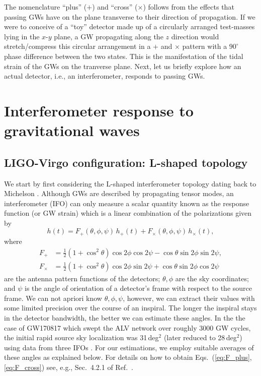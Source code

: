 \documentclass[prd,amsmath,amssymb,aps,floats,amsfonts,notitlepage,superscriptaddress,eqsecnum,nofootinbib,10pt]{revtex4-1}
\newcommand{\f}{\frac}
\newcommand{\be}{\begin{equation}}
\newcommand{\ee}{\end{equation}}
\begin{document}
The nomenclature ``plus'' ($+$) and ``cross'' ($\times$) follows from the effects that passing GWs have on the plane transverse to their direction of propagation.
If we were to conceive of a ``toy'' detector made up of a circularly arranged test-masses lying in the $x$-$y$ plane, a GW propagating along the $z$ direction would stretch/compress this circular arrangement in a $+$ and $\times$ pattern 
with a $90^\circ$ phase difference between the two states.
This is the manifestation of the tidal strain of the GWs on the tranverse plane.
Next, let us briefly explore how an actual detector, i.e., an interferometer, responds to passing GWs.


\section{Interferometer response to gravitational waves}\label{sec:IFO_response}
\subsection{LIGO-Virgo configuration: L-shaped topology}\label{sec:LIGO_topo}
We start by first considering the L-shaped interferometer topology dating back to Michelson \cite{Michelson:1887zz}.
Although GWs are described by propagating tensor modes, an interferometer (IFO) can only measure a scalar quantity
known as the response function (or GW strain) which is a linear combination of the polarizations given by
%
\be
h(t) = F_+(\theta,\phi,\psi) \,h_+(t)+F_\times(\theta,\phi,\psi)\, h_\times(t) , \label{eq:detector_strain}
\ee
%
where
%
\begin{align}
 F_+ &=\f{1}{2}\left(1+\cos^2\theta\right)\cos2\phi\cos 2\psi-\cos\theta \sin2\phi \sin2\psi \label{eq:F_plus},\\
 F_\times &=\f{1}{2}\left(1+\cos^2\theta\right)\cos2\phi\sin2\psi+\cos\theta \sin2\phi \cos2\psi \label{eq:F_cross}
\end{align}
%
are the antenna pattern functions of the detectors; $\theta,\phi$ are the sky coordinates; and $\psi$ is
the angle of orientation of a detector's frame with respect to the source frame. %
%
We can not apriori know $\theta, \phi,\psi$, however, we can extract their values with some limited precision over the course of an inspiral.
The longer the inspiral stays in the detector bandwidth, the better we can estimate these angles.
In the the case of GW170817 which swept the ALV network over roughly 3000 GW cycles, 
the initial rapid source sky localization was 31\,deg$^2$ (later reduced to 28\,deg$^2$) using data from three IFOs \cite{GW170817}. 
For our estimations, we employ suitable averages of these angles as explained below.
For details on how to obtain Eqs.~(\ref{eq:F_plus}, \ref{eq:F_cross}) see, e.g., Sec.~4.2.1 of Ref.~\cite{SchutzLRR}.
\end{document}
